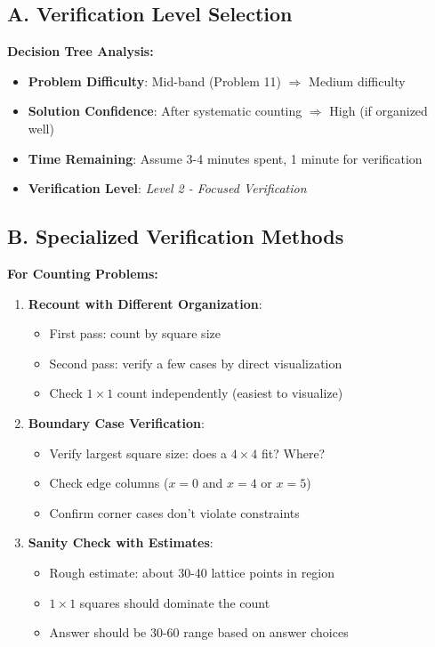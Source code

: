 \documentclass[12pt]{article}
\begin{document}
\begin{verificationbox}
\subsection*{A. Verification Level Selection}

\textbf{Decision Tree Analysis:}
\begin{itemize}
    \item \textbf{Problem Difficulty}: Mid-band (Problem 11) $\Rightarrow$ Medium difficulty
    \item \textbf{Solution Confidence}: After systematic counting $\Rightarrow$ High (if organized well)
    \item \textbf{Time Remaining}: Assume 3-4 minutes spent, 1 minute for verification
    \item \textbf{Verification Level}: \textit{Level 2 - Focused Verification}
\end{itemize}

\subsection*{B. Specialized Verification Methods}

\textbf{For Counting Problems:}
\begin{enumerate}
    \item \textbf{Recount with Different Organization}:
    \begin{itemize}
        \item First pass: count by square size
        \item Second pass: verify a few cases by direct visualization
        \item Check $1 \times 1$ count independently (easiest to visualize)
    \end{itemize}
    
    \item \textbf{Boundary Case Verification}:
    \begin{itemize}
        \item Verify largest square size: does a $4 \times 4$ fit? Where?
        \item Check edge columns ($x=0$ and $x=4$ or $x=5$)
        \item Confirm corner cases don't violate constraints
    \end{itemize}
    
    \item \textbf{Sanity Check with Estimates}:
    \begin{itemize}
        \item Rough estimate: about 30-40 lattice points in region
        \item $1 \times 1$ squares should dominate the count
        \item Answer should be 30-60 range based on answer choices
    \end{itemize}
    

\end{enumerate}
\end{verificationbox}
\end{document}
